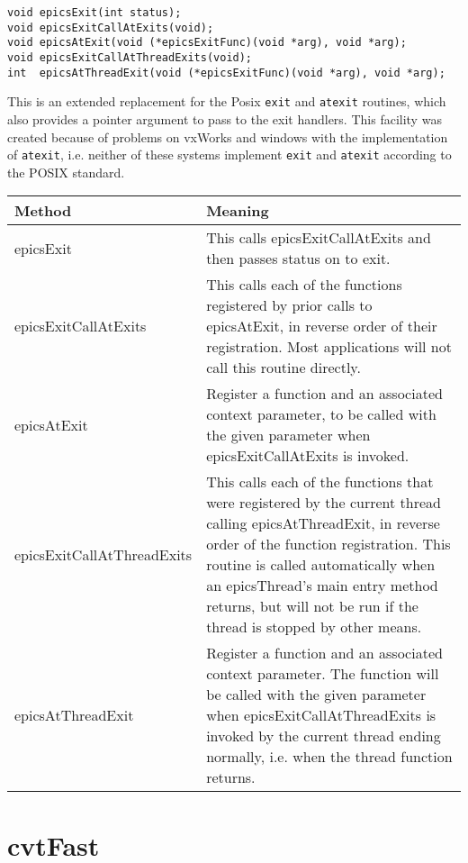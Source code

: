 \begin{verbatim}void epicsExit(int status);
void epicsExitCallAtExits(void);
void epicsAtExit(void (*epicsExitFunc)(void *arg), void *arg);
void epicsExitCallAtThreadExits(void);
int  epicsAtThreadExit(void (*epicsExitFunc)(void *arg), void *arg);
\end{verbatim}
This is an extended replacement for the Posix \verb|exit| and \verb|atexit| routines, which also provides a pointer argument to pass 
to the exit handlers. This facility was created because of problems on vxWorks and windows with the implementation of 
\verb|atexit|, i.e. neither of these systems implement \verb|exit| and \verb|atexit| according to the POSIX standard.
\begin{center}\begin{longtable}{p{2.0in}p{4.4in}}
\textbf{Method} & \textbf{Meaning}\\
\hline
epicsExit & This calls epicsExitCallAtExits and then passes status on to exit.\\
epicsExitCallAtExits & This calls each of the functions registered by prior calls to epicsAtExit, in reverse order of their registration.  Most applications will not call this routine directly.\\
epicsAtExit & Register a function and an associated context parameter, to be called with the given parameter when epicsExitCallAtExits is invoked.\\
epicsExitCallAtThreadExits & This calls each of the functions that were registered by the current thread calling epicsAtThreadExit, in reverse order of the function registration.  This routine is called automatically when an epicsThread's main entry method returns, but will not be run if the thread is stopped by other means.\\
epicsAtThreadExit & Register a function and an associated context parameter. The function will be called with the given parameter when epicsExitCallAtThreadExits is invoked by the current thread ending normally, i.e. when the thread function returns.
\end{longtable}\end{center}


\section{cvtFast}

